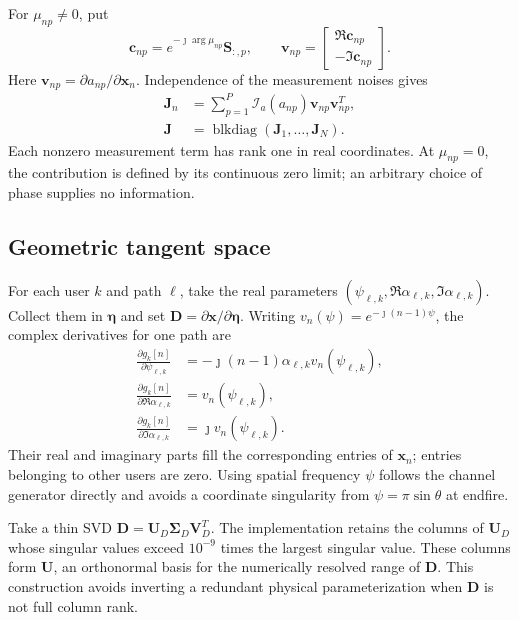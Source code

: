 For $\mu_{np}\ne0$, put
\begin{equation}
\mathbf c_{np}=e^{-\jmath\arg\mu_{np}}\mathbf S_{:,p},
\qquad
\mathbf v_{np}=
\begin{bmatrix}\Re\mathbf c_{np}\\-\Im\mathbf c_{np}\end{bmatrix}.
\end{equation}
Here $\mathbf v_{np}=\partial a_{np}/\partial\mathbf x_n$.
Independence of the measurement noises gives
\begin{align}
\mathbf J_n&=\sum_{p=1}^{P}
  \mathcal I_a(a_{np})\mathbf v_{np}\mathbf v_{np}^T,\\
\mathbf J&=\operatorname{blkdiag}
 (\mathbf J_1,\ldots,\mathbf J_N).
\label{eq:revision-real-fisher}
\end{align}
Each nonzero measurement term has rank one in real coordinates. At
$\mu_{np}=0$, the contribution is defined by its continuous zero limit;
an arbitrary choice of phase supplies no information.

\subsection{Geometric tangent space}

For each user $k$ and path $\ell$, take the real parameters
$(\psi_{\ell,k},\Re\alpha_{\ell,k},\Im\alpha_{\ell,k})$.
Collect them in $\boldsymbol\eta$ and set
$\mathbf D=\partial\mathbf x/\partial\boldsymbol\eta$.
Writing $v_n(\psi)=e^{-\jmath(n-1)\psi}$, the complex derivatives for
one path are
\begin{align}
\frac{\partial g_k[n]}{\partial\psi_{\ell,k}}
 &=-\jmath(n-1)\alpha_{\ell,k}v_n(\psi_{\ell,k}),\\
\frac{\partial g_k[n]}{\partial\Re\alpha_{\ell,k}}
 &=v_n(\psi_{\ell,k}),\\
\frac{\partial g_k[n]}{\partial\Im\alpha_{\ell,k}}
 &=\jmath v_n(\psi_{\ell,k}).
\end{align}
Their real and imaginary parts fill the corresponding entries of
$\mathbf x_n$; entries belonging to other users are zero. Using spatial
frequency $\psi$ follows the channel generator directly and avoids a
coordinate singularity from $\psi=\pi\sin\theta$ at endfire.

Take a thin SVD $\mathbf D=\mathbf U_D\boldsymbol\Sigma_D\mathbf V_D^T$.
The implementation retains the columns of $\mathbf U_D$ whose singular
values exceed $10^{-9}$ times the largest singular value. These columns
form $\mathbf U$, an orthonormal basis for the numerically resolved range
of $\mathbf D$. This construction avoids inverting a redundant physical
parameterization when $\mathbf D$ is not full column rank.

